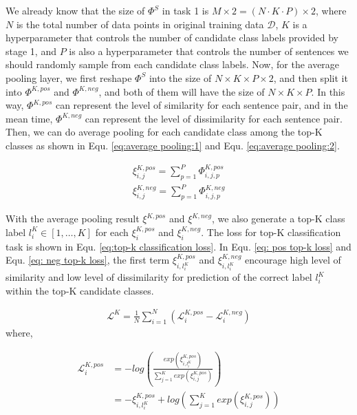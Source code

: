 \documentclass[letterpaper]{article} %
\begin{document}
  We  already  know  that the size of ${\Phi}^S$ in task 1 is $M\times 2=(N\cdot
  K\cdot  P)\times  2$, where $N$ is the total number of data points in original
  training  data $\mathcal{D}$, $K$ is a hyperparameter that controls the number
  of   candidate   class  labels  provided  by  stage  1,  and  $P$  is  also  a
  hyperparameter that controls the number of sentences we should randomly sample
  from each candidate class labels. Now, for the average pooling layer, we first
  reshape  ${\Phi}^S$  into  the  size  of $N\times K\times P\times 2$, and then
  split  it  into  ${\Phi}^{K,pos}$  and ${\Phi}^{K,neg}$, and both of them will
  have  the  size  of  $N\times  K\times  P$.  In this way, ${\Phi}^{K,pos}$ can
  represent  the  level  of  similarity  for each sentence pair, and in the mean
  time,  ${\Phi}^{K,neg}$  can  represent  the  level  of dissimilarity for each
  sentence  pair. Then, we can do average pooling for each candidate class among
  the  top-K  classes  as  shown  in  Equ.  \ref{eq:average  pooling:1} and Equ.
  \ref{eq:average pooling:2}.

  \begin{align}
    {\xi}_{i,j}^{K,pos} = \sum_{p=1}^{P}{\varPhi}_{i,j,p}^{K,pos} \label{eq:average pooling:1}\\
    {\xi}_{i,j}^{K,neg} = \sum_{p=1}^{P}{\varPhi}_{i,j,p}^{K,neg}
    \label{eq:average pooling:2}
  \end{align}

  With  the  average pooling result ${\xi}^{K,pos}$ and ${\xi}^{K,neg}$, we also
  generate   a   top-K   class   label   $l^{K}_i\in   [1,\dots,K]$   for   each
  ${\xi}^{K,pos}_{i}$ and ${\xi}^{K,neg}_{i}$. The loss for top-K classification
  task is shown in Equ. \ref{eq:top-k classification loss}. In Equ. \ref{eq: pos
  top-k   loss}   and   Equ.   \ref{eq:   neg   top-k   loss},  the  first  term
  $\xi_{i,l^{K}_{i}}^{K,pos}$  and  $\xi_{i,l^{K}_{i}}^{K,neg}$  encourage  high
  level  of  similarity  and  low  level  of dissimilarity for prediction of the
  correct label $l^{K}_i$ within the top-K candidate classes.

  \begin{align}
    \mathcal{L}^{K} = \frac{1}{N}\sum_{i=1}^{N}(\mathcal{L}^{K,pos}_{i} - \mathcal{L}^{K,neg}_{i})
    \label{eq:top-k classification loss}
  \end{align}
  where,

  \begin{equation}
    \begin{aligned}
      \mathcal{L}^{K,pos}_{i} &= -log(\frac{exp(\xi_{i,l^{K}_{i}}^{K,pos})}{\sum_{j=1}^{K}exp(\xi_{i,j}^{K,pos})}) \\
      &= -\xi_{i,l^{K}_{i}}^{K,pos} + log(\sum_{j=1}^{K}exp(\xi_{i,j}^{K,pos}))
      \label{eq: pos top-k loss}
    \end{aligned}
  \end{equation}
\end{document}
